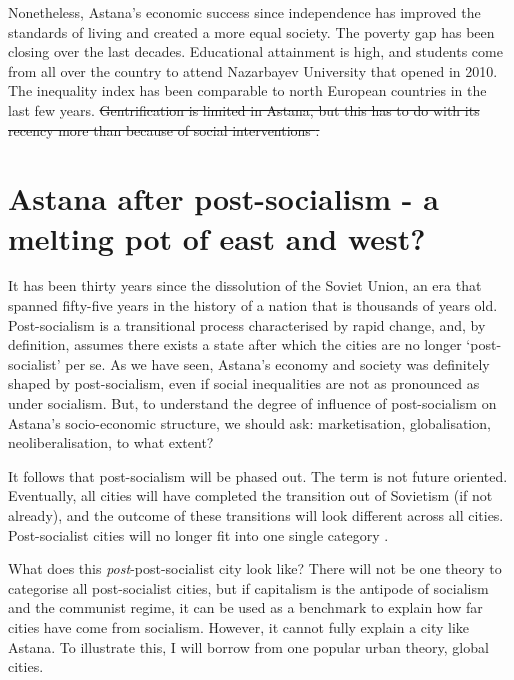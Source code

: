 \documentclass{article}
\begin{document}
Nonetheless, Astana's economic success since independence has improved the standards of living and created a more equal society. The poverty gap has been closing over the last decades. Educational attainment is high, and students come from all over the country to attend Nazarbayev University that opened in 2010. The inequality index has been comparable to north European countries in the last few years. \sout{Gentrification is limited in Astana, but this has to do with its recency more than because of social interventions \parencite{required}.}

\section{Astana after post-socialism - a melting pot of east and west?}


It has been thirty years since the dissolution of the Soviet Union, an era that spanned fifty-five years in the history of a nation that is thousands of years old. Post-socialism is a transitional process characterised by rapid change, and, by definition, assumes there exists a state after which the cities are no longer `post-socialist' per se. 
As we have seen, Astana's economy and society was definitely shaped by post-socialism, even if social inequalities are not as pronounced as under socialism. But, to understand the degree of influence of post-socialism on Astana's socio-economic structure, we should ask: marketisation, globalisation, neoliberalisation, to what extent?

It follows that post-socialism will be phased out. The term is not future oriented. Eventually, all cities will have completed the transition out of Sovietism (if not already), and the outcome of these transitions will look different across all cities. Post-socialist cities will no longer fit into one single category \parencite{hirt2016conceptual}.

What does this \textit{post}-post-socialist city look like? 
There will not be one theory to categorise all post-socialist cities, but if capitalism is the antipode of socialism and the communist regime, it can be used as a benchmark to explain how far cities have come from socialism. However, it cannot fully explain a city like Astana. To illustrate this, I will borrow from one popular urban theory, global cities.
\end{document}
